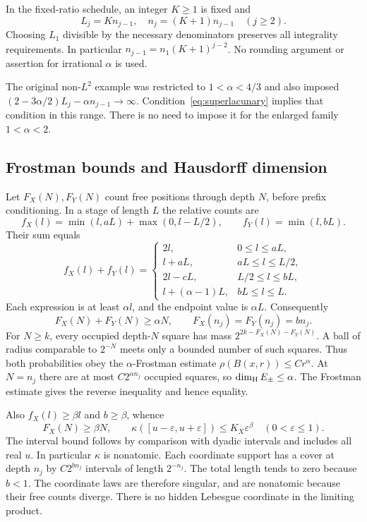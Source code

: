 In the fixed-ratio schedule, an integer $K\geq1$ is fixed and
\begin{equation}\label{eq:fixed-schedule}
 L_j=K n_{j-1},\quad n_j=(K+1)n_{j-1}\quad(j\geq2).
\end{equation}
Choosing $L_1$ divisible by the necessary denominators preserves all
integrality requirements. In particular $n_{j-1}=n_1(K+1)^{j-2}$.
No rounding argument or assertion for irrational $\alpha$ is used.

The original non-$L^2$ example was restricted to $1<\alpha<4/3$ and also
imposed $(2-3\alpha/2)L_j-\alpha n_{j-1}\to\infty$.
Condition~\eqref{eq:superlacunary} implies that condition in this range.
There is no need to impose it for the enlarged family $1<\alpha<2$.

\subsection{Frostman bounds and Hausdorff dimension}
Let $F_X(N),F_Y(N)$ count free positions through depth $N$, before prefix
conditioning. In a stage of length $L$ the relative counts are
\[
 f_X(l)=\min(l,aL)+\max(0,l-L/2),\qquad f_Y(l)=\min(l,bL).
\]
Their sum equals
\begin{equation}\label{eq:total-free}
 f_X(l)+f_Y(l)=
 \begin{cases}
 2l,&0\leq l\leq aL,\\
 l+aL,&aL\leq l\leq L/2,\\
 2l-cL,&L/2\leq l\leq bL,\\
 l+(\alpha-1)L,&bL\leq l\leq L.
 \end{cases}
\end{equation}
Each expression is at least $\alpha l$, and the endpoint value is
$\alpha L$. Consequently
\begin{equation}\label{eq:counts}
 F_X(N)+F_Y(N)\geq\alpha N,\qquad
 F_X(n_j)=F_Y(n_j)=bn_j.
\end{equation}
For $N\geq k$, every occupied depth-$N$ square has mass
$2^{2k-F_X(N)-F_Y(N)}$. A ball of radius comparable to $2^{-N}$ meets
only a bounded number of such squares. Thus both probabilities obey the
$\alpha$-Frostman estimate $\rho(B(x,r))\leq C r^\alpha$.
At $N=n_j$ there are at most $C2^{\alpha n_j}$ occupied squares, so
$\dim_{\mathrm H} E_\pm\leq\alpha$. The Frostman estimate gives the reverse
inequality and hence equality.

Also $f_X(l)\geq\beta l$ and $b\geq\beta$, whence
\begin{equation}\label{eq:horizontal-frostman}
 F_X(N)\geq\beta N,\qquad
 \kappa([u-\varepsilon,u+\varepsilon])\leq K_X\varepsilon^\beta
 \quad(0<\varepsilon\leq1).
\end{equation}
The interval bound follows by comparison with dyadic intervals and includes
all real $u$. In particular $\kappa$ is nonatomic. Each coordinate support
has a cover at depth $n_j$ by $C2^{bn_j}$ intervals of length $2^{-n_j}$.
The total length tends to zero because $b<1$. The coordinate laws are
therefore singular, and are nonatomic because their free counts diverge.
There is no hidden Lebesgue coordinate in the limiting product.

